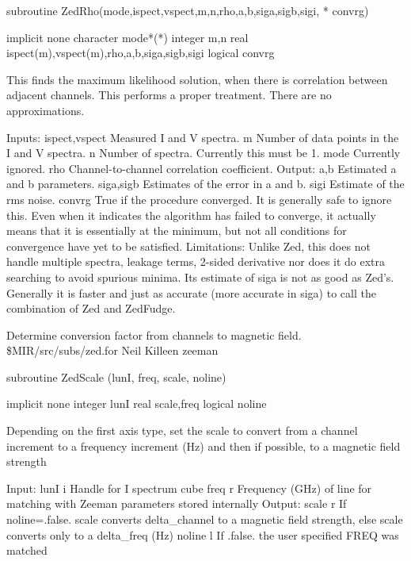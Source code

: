 \par{\tenpoint
{\eightpoint\begintt
        subroutine ZedRho(mode,ispect,vspect,m,n,rho,a,b,siga,sigb,sigi,
     *                                          convrg)

        implicit none
        character mode*(*)
        integer m,n
        real ispect(m),vspect(m),rho,a,b,siga,sigb,sigi
        logical convrg

  This finds the maximum likelihood solution, when there is correlation
  between adjacent channels. This performs a proper treatment. There are
  no approximations.

  Inputs:
    ispect,vspect Measured I and V spectra.
    m          Number of data points in the I and V spectra.
    n          Number of spectra. Currently this must be 1.
    mode       Currently ignored.
    rho        Channel-to-channel correlation coefficient.
  Output:
    a,b        Estimated a and b parameters.
    siga,sigb  Estimates of the error in a and b.
    sigi       Estimate of the rms noise.
    convrg     True if the procedure converged. It is generally safe to
               ignore this. Even when it indicates the algorithm has
               failed to converge, it actually means that it is essentially
               at the minimum, but not all conditions for convergence have
               yet to be satisfied.
  Limitations:
    Unlike Zed, this does not handle multiple spectra, leakage terms,
    2-sided derivative nor does it do extra searching to avoid spurious
    minima. Its estimate of siga is not as good as Zed's. Generally
    it is faster and just as accurate (more accurate in siga) to call
    the combination of Zed and ZedFudge.
\endtt}
\par}
%
\noindent Determine conversion factor from channels to magnetic field.
\newline \ 
\newline {} \$MIR/src/subs/zed.for
\newline {} Neil Killeen
\newline {} zeeman
\par{\tenpoint
{\eightpoint\begintt
      subroutine ZedScale (lunI, freq, scale, noline)

      implicit none
      integer lunI
      real scale,freq
      logical noline

     Depending on the first axis type, set the scale to convert
     from a channel increment to a frequency increment (Hz) and then
     if possible, to a magnetic field strength

     Input:
        lunI    i  Handle for I spectrum cube
        freq    r  Frequency (GHz) of line for matching with
                   Zeeman parameters stored internally   
     Output:
        scale   r  If noline=.false. scale converts delta_channel to
                   a magnetic field strength, else scale converts
                   only to a delta_freq (Hz)
        noline  l  If .false. the user specified FREQ was matched
\endtt}
\par}
